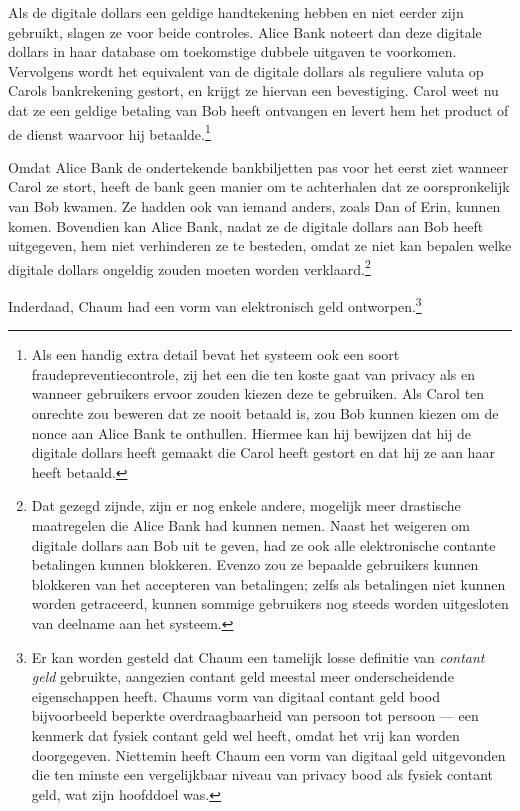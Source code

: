\documentclass[
  a5paper,
  smalldemyvopaper,11pt,twoside,onecolumn,openright,extrafontsizes,
hidelinks]{memoir}
\begin{document}
Als de digitale dollars een geldige handtekening hebben en niet eerder
zijn gebruikt, slagen ze voor beide controles. Alice Bank noteert dan
deze digitale dollars in haar database om toekomstige dubbele uitgaven
te voorkomen. Vervolgens wordt het equivalent van de digitale dollars
als reguliere valuta op Carols bankrekening gestort, en krijgt ze
hiervan een bevestiging. Carol weet nu dat ze een geldige betaling van
Bob heeft ontvangen en levert hem het product of de dienst waarvoor hij
betaalde.\footnote{Als een handig extra detail bevat het systeem ook een
  soort fraudepreventiecontrole, zij het een die ten koste gaat van
  privacy als en wanneer gebruikers ervoor zouden kiezen deze te
  gebruiken. Als Carol ten onrechte zou beweren dat ze nooit betaald is,
  zou Bob kunnen kiezen om de nonce aan Alice Bank te onthullen. Hiermee
  kan hij bewijzen dat hij de digitale dollars heeft gemaakt die Carol
  heeft gestort en dat hij ze aan haar heeft betaald.}

Omdat Alice Bank de ondertekende bankbiljetten pas voor het eerst ziet
wanneer Carol ze stort, heeft de bank geen manier om te achterhalen dat
ze oorspronkelijk van Bob kwamen. Ze hadden ook van iemand anders, zoals
Dan of Erin, kunnen komen. Bovendien kan Alice Bank, nadat ze de
digitale dollars aan Bob heeft uitgegeven, hem niet verhinderen ze te
besteden, omdat ze niet kan bepalen welke digitale dollars ongeldig
zouden moeten worden verklaard.\footnote{Dat gezegd zijnde, zijn er nog
  enkele andere, mogelijk meer drastische maatregelen die Alice Bank had
  kunnen nemen. Naast het weigeren om digitale dollars aan Bob uit te
  geven, had ze ook alle elektronische contante betalingen kunnen
  blokkeren. Evenzo zou ze bepaalde gebruikers kunnen blokkeren van het
  accepteren van betalingen; zelfs als betalingen niet kunnen worden
  getraceerd, kunnen sommige gebruikers nog steeds worden uitgesloten
  van deelname aan het systeem.}

Inderdaad, Chaum had een vorm van elektronisch geld
ontworpen.\footnote{Er kan worden gesteld dat Chaum een tamelijk losse
  definitie van \emph{contant geld} gebruikte, aangezien contant geld
  meestal meer onderscheidende eigenschappen heeft. Chaums vorm van
  digitaal contant geld bood bijvoorbeeld beperkte overdraagbaarheid van
  persoon tot persoon --- een kenmerk dat fysiek contant geld wel heeft,
  omdat het vrij kan worden doorgegeven. Niettemin heeft Chaum een vorm
  van digitaal geld uitgevonden die ten minste een vergelijkbaar niveau
  van privacy bood als fysiek contant geld, wat zijn hoofddoel was.}
\end{document}
